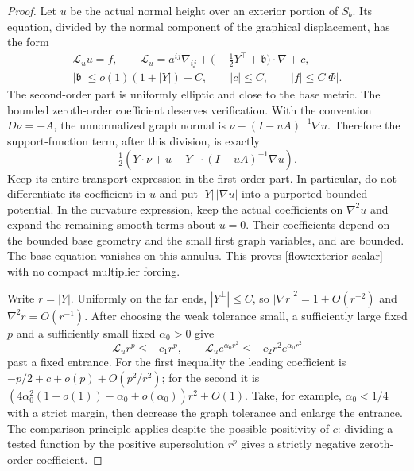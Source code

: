 \begin{proof}
Let $u$ be the actual normal height over an exterior portion of
$S_b$.  Its equation, divided by the normal component of the
graphical displacement, has the form
\begin{equation}\label{flow:exterior-scalar}
 \begin{gathered}
 \mathcal L_u u=f,\qquad
 \mathcal L_u=a^{ij}\nabla_{ij}
       +\bigl(-\tfrac12Y^\top+\mathfrak b\bigr)\cdot\nabla+c,\\
 |\mathfrak b|\le o(1)(1+|Y|)+C,\qquad
 |c|\le C,\qquad |f|\le C|\Phi|.
 \end{gathered}
\end{equation}
The second-order part is uniformly elliptic and close to the base
metric.  The bounded zeroth-order coefficient deserves verification.
With the convention $D\nu=-A$, the unnormalized graph normal is
$\nu-(I-uA)^{-1}\nabla u$.  Therefore the support-function term,
after this division, is exactly
\begin{equation}\label{flow:support-transport}
 \tfrac12\left(Y\cdot\nu+u
      -Y^\top\cdot(I-uA)^{-1}\nabla u\right).
\end{equation}
Keep its entire transport expression in the first-order part.
In particular, do not differentiate its coefficient in $u$ and
put $|Y|\,|\nabla u|$ into a purported bounded potential.
In the curvature expression, keep the actual coefficients on
$\nabla^2u$ and expand the remaining smooth terms about $u=0$.
Their coefficients depend on the bounded base geometry and the
small first graph variables, and are bounded.  The base equation
vanishes on this annulus.  This proves
\eqref{flow:exterior-scalar} with no compact multiplier forcing.

Write $r=|Y|$.  Uniformly on the far ends, $|Y^\perp|\le C$,
so $|\nabla r|^2=1+O(r^{-2})$ and $\nabla^2r=O(r^{-1})$.
After choosing the weak tolerance small, a sufficiently large
fixed $p$ and a sufficiently small fixed $\alpha_0>0$ give
\begin{equation}\label{flow:supersolutions}
 \mathcal L_u r^p\le-c_1r^p,
 \qquad
 \mathcal L_u e^{\alpha_0r^2}
                   \le-c_2r^2e^{\alpha_0r^2}
\end{equation}
past a fixed entrance.  For the first inequality the leading
coefficient is $-p/2+c+o(p)+O(p^2/r^2)$; for the second it is
$(4\alpha_0^2(1+o(1))-\alpha_0+o(\alpha_0))r^2+O(1)$.
Take, for example, $\alpha_0<1/4$ with a strict margin, then
decrease the graph tolerance and enlarge the entrance.
The comparison principle applies despite the possible positivity
of $c$: dividing a tested function by the positive supersolution
$r^p$ gives a strictly negative zeroth-order coefficient.


\end{proof}
